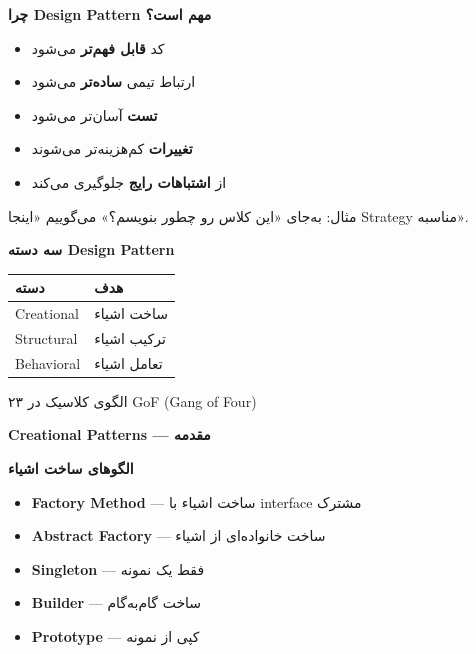 \documentclass[14pt, a4paper, landscape]{extarticle}
\newcommand{\slide}[1]{%
    \newpage
    \begin{center}
    \begin{minipage}[t]{0.95\textwidth}
    \vspace{0.5cm}
    #1
    \vspace{0.5cm}
    \end{minipage}
    \end{center}
}
\newcommand{\slidetitle}[1]{%
    \begin{center}
        {\LARGE\bfseries\textcolor{primary}{#1}}
    \end{center}
    \vspace{0.5cm}
}
\newcommand{\myaccent}[1]{\textcolor{accent}{#1}}
\begin{document}
\slide{
    \slidetitle{چرا Design Pattern مهم است؟}
    \vspace{0.5cm}
    \begin{itemize}[itemsep=0.6em]
        \item {\large کد \textbf{قابل فهم‌تر} می‌شود}
        \item {\large ارتباط تیمی \textbf{ساده‌تر} می‌شود}
        \item {\large \textbf{تست} آسان‌تر می‌شود}
        \item {\large \textbf{تغییرات} کم‌هزینه‌تر می‌شوند}
        \item {\large از \textbf{اشتباهات رایج} جلوگیری می‌کند}
    \end{itemize}
    \vspace{0.8cm}
    \begin{center}
        {\large\myaccent{مثال: به‌جای «این کلاس رو چطور بنویسم؟» می‌گوییم 
«اینجا Strategy مناسبه».}}
    \end{center}
}

\slide{
    \slidetitle{سه دسته Design Pattern}
    \vspace{0.5cm}
    \begin{center}
        \begin{tabular}{lp{9cm}}
            \toprule
            \textbf{دسته} & \textbf{هدف} \\
            \midrule
            Creational & ساخت اشیاء \\
            \hline
            Structural & ترکیب اشیاء \\
            \hline
            Behavioral & تعامل اشیاء \\
            \bottomrule
        \end{tabular}
    \end{center}
    \vspace{0.8cm}
    \begin{center}
        {\myaccent{۲۳ الگوی کلاسیک در GoF (Gang of Four)}}
    \end{center}
}

\slide{
    \slidetitle{Creational Patterns — مقدمه}
    \vspace{0.5cm}
    \begin{center}
        {\large\bfseries الگوهای ساخت اشیاء}
    \end{center}
    \vspace{0.8cm}
    \begin{itemize}[itemsep=0.5em]
        \item {\large \textbf{Factory Method} — ساخت اشیاء با interface 
مشترک}
        \item {\large \textbf{Abstract Factory} — ساخت خانواده‌ای از اشیاء}
        \item {\large \textbf{Singleton} — فقط یک نمونه}
        \item {\large \textbf{Builder} — ساخت گام‌به‌گام}
        \item {\large \textbf{Prototype} — کپی از نمونه}
    \end{itemize}
}
\end{document}
